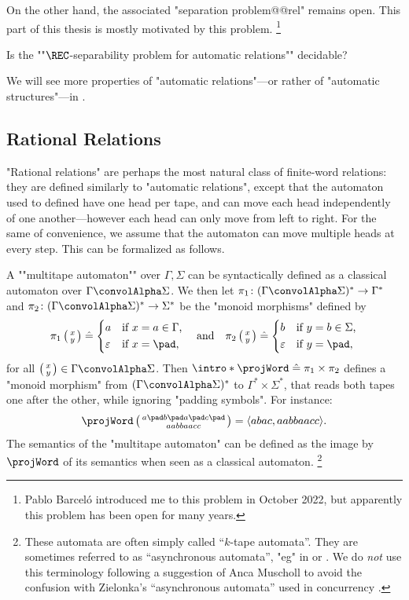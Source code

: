 On the other hand, the associated "separation problem@@rel" remains open.
This part of this thesis is mostly motivated by this problem.%
\footnote{Pablo Barceló introduced me to this problem in October 2022,
but apparently this problem has been open for many years.}

\begin{openproblem}
	Is the ""$\REC$-separability problem for automatic relations"" decidable?
\end{openproblem}

We will see more properties of "automatic relations"---or rather of "automatic structures"---in
.

\subsection{Rational Relations}

"Rational relations" are perhaps the most natural class of finite-word relations:
they are defined similarly to "automatic relations", except that
the automaton used to defined have one head per tape, and can move each head
independently of one another---however each head can only move from left to right.
For the same of convenience, we assume that the automaton can move multiple heads at every step.
This can be formalized as follows.

A \AP""multitape automaton"" over $\Gamma,\Sigma$
can be syntactically defined as a classical automaton over $\Gamma \convolAlpha \Sigma$.
We then let $\pi_1\colon (\Gamma\convolAlpha\Sigma)^* \to \Gamma^*$ and 
$\pi_2\colon (\Gamma\convolAlpha\Sigma)^* \to \Sigma^*$ be the "monoid morphisms"
defined by
\[
	\pi_1\pair{x}{y}\defeq \begin{cases*}
		a & \text{if $x = a \in \Gamma$,}\\
		\varepsilon & \text{if $x=\pad$,}
	\end{cases*}
	\quad\text{and}\quad
	\pi_2\pair{x}{y}\defeq \begin{cases*}
		b & \text{if $y = b \in \Sigma$,}\\
		\varepsilon & \text{if $y=\pad$,}
	\end{cases*}
\]
for all $\pair{x}{y}\in \Gamma\convolAlpha\Sigma$.
Then \AP$\intro*\projWord \defeq \pi_1 \times \pi_2$ defines a "monoid morphism" 
from $(\Gamma\convolAlpha\Sigma)^*$ to $\Gamma^* \times \Sigma^*$,
that reads both tapes one after the other, while ignoring "padding symbols".
For instance:
\[
	\projWord\pair{a \pad b \pad a \pad c \pad}{a a b b a a c c}
	= \tup{abac, aabbaacc}.
\]
The semantics of the "multitape automaton"
can be defined as the image by $\projWord$ of its semantics when seen as a
classical automaton.%
\footnote[][-15em]{These automata are often simply called ``$k$-tape automata''. 
They are sometimes referred to as ``asynchronous automata'',
"eg" in \cite[\S~3]{CarayolLoding2011Uniformization} or
\cite[\S~3.1.2.2, p.~88]{Pelecq1997Isomorphismes}.
We do \emph{not} use this terminology following a suggestion
of Anca Muscholl to avoid the confusion with Zielonka's ``asynchronous automata'' used in 
concurrency \cite[\S~4]{Zielonka1987AsynchronousAutomata}.}


